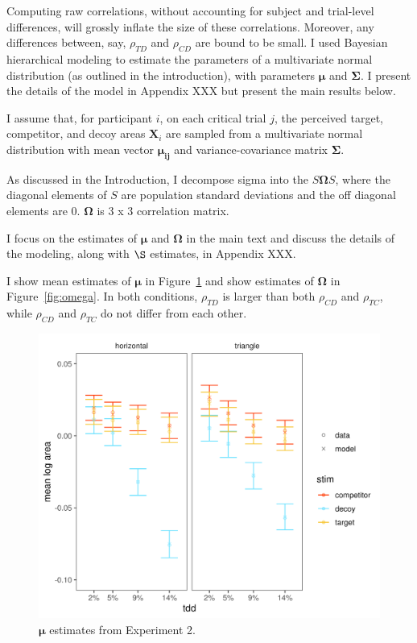 Computing raw correlations, without accounting for subject and trial-level differences, will grossly inflate the size of these correlations. Moreover, any differences between, say, $\rho_{TD}$ and $\rho_{CD}$ are bound to be small. I used Bayesian hierarchical modeling to estimate the parameters of a multivariate normal distribution (as outlined in the introduction), with parameters $\boldsymbol{\mu}$ and $\boldsymbol{\Sigma}$. I present the details of the model in Appendix XXX but present the main results below.

I assume that, for participant $i$, on each critical trial $j$, the perceived target, competitor, and decoy areas $\mathbf{X}_i$ are sampled from a multivariate normal distribution with mean vector $\boldsymbol{\mu_{ij}}$ and variance-covariance matrix $\boldsymbol{\Sigma}$. 

As discussed in the Introduction, I decompose sigma into the $S\boldsymbol{\Omega}S$, where the diagonal elements of $S$ are population standard deviations and the off diagonal elements are $0$. $\boldsymbol{\Omega}$ is 3 x 3 correlation matrix.  

I focus on the estimates of $\boldsymbol{\mu}$ and $\boldsymbol{\Omega}$ in the main text and discuss the details of the modeling, along with $\S$ estimates, in Appendix XXX. 

I show mean estimates of $\boldsymbol{\mu}$ in Figure~\ref{fig:e2mu} and show estimates of $\boldsymbol{\Omega}$ in Figure~\ref{fig:omega}. In both conditions, $\rho_{TD}$ is larger than both $\rho_{CD}$ and $\rho_{TC}$, while $\rho_{CD}$ and $\rho_{TC}$ do not differ from each other. 

\begin{figure}
   \includegraphics[width=\textwidth]{figures/bayes_circle_area_mu_sigma_constant_comp_effect_model_v_data_collapsed.jpeg}
   \caption{$\boldsymbol{\mu}$ estimates from Experiment 2.}
   \label{fig:e2mu}
\end{figure}

